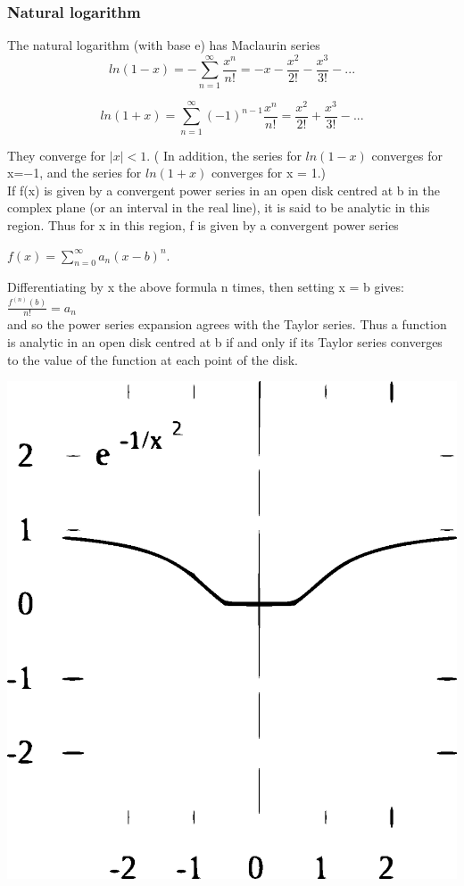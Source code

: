 \subsubsection{Natural logarithm}
The natural logarithm (with base e) has Maclaurin series
\begin{equation}
  ln(1-x) = -\sum_{n=1}^{\infty} \frac{x^{n}}{n!} = -x- \frac{x^2}{2!}- \frac{x^3}{3!}-...
\end{equation}

\begin{equation}
  ln(1+x) = \sum_{n=1}^{\infty} (-1)^{n-1}\frac{x^{n}}{n!} = \frac{x^2}{2!}+ \frac{x^3}{3!}-...
\end{equation}

They converge for $|x|<1$. ( In addition, the series for $ln(1 − x)$ converges for x=−1, and the series for $ln(1 + x)$ converges for x = 1.)\\

If f(x) is given by a convergent power series in an open disk centred at b in the complex plane (or an interval in the real line), it is said to be analytic in this region. Thus for x in this region, f is given by a convergent power series

${\displaystyle f(x)=\sum _{n=0}^{\infty }a_{n}(x-b)^{n}.}$

Differentiating by x the above formula n times, then setting x = b gives:\\

${\displaystyle {\frac {f^{(n)}(b)}{n!}}=a_{n}}$\\

and so the power series expansion agrees with the Taylor series. Thus a function is analytic in an open disk centred at b if and only if its Taylor series converges to the value of the function at each point of the disk.

\includegraphics[scale=0.5]{450px-Exp_neg_inverse_square.svg.eps}

